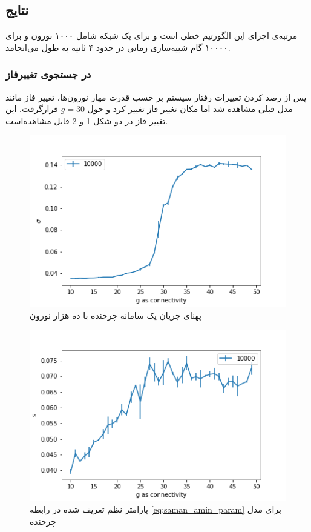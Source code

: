 \documentclass[12pt,onecolumn,a4paper]{article}
\begin{document}
\subsection{نتایج }
مرتبه‌ی اجرای این الگورتیم خطی است و برای یک شبکه شامل ۱۰۰۰ نورون و برای ۱۰۰۰۰ گام شبیه‌سازی زمانی در حدود ۴ ثانیه به طول می‌انجامد. 


\subsubsection{در جستجوی تغییرفاز}
پس از رصد کردن تغییرات رفتار سیستم بر حسب قدرت مهار نورون‌ها، تغییر فاز مانند مدل قبلی مشاهده شد اما مکان تغییر فاز تغییر کرد و حول $g=30$ قرارگرفت. این تغییر فاز در دو شکل \ref{fig:sigma_rotational} و \ref{fig:amin_saman_rotational}  قابل مشاهده‌است.
\begin{figure}
\centering
  \includegraphics[width = 10 cm]{figs/Rotational/sigma.png}
 \caption{پهنای جریان یک سامانه چرخنده با ده هزار نورون}
  \label{fig:sigma_rotational}
\end{figure}

\begin{figure}
\centering
  \includegraphics[width = 10 cm]{figs/Rotational/amin_saman_param.png}
 \caption{پارامتر نظم تعریف شده در رابطه \ref{eq:saman_amin_param} برای مدل چرخنده }
  \label{fig:amin_saman_rotational}
\end{figure}
\end{document}
